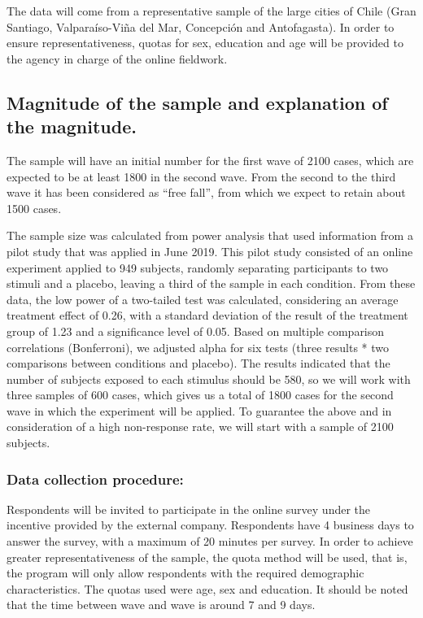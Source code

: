 \documentclass[
]{article}
\begin{document}
The data will come from a representative sample of the large cities of
Chile (Gran Santiago, Valparaíso-Viña del Mar, Concepción and
Antofagasta). In order to ensure representativeness, quotas for sex,
education and age will be provided to the agency in charge of the online
fieldwork.

\hypertarget{magnitude-of-the-sample-and-explanation-of-the-magnitude.}{%
\subsection{Magnitude of the sample and explanation of the
magnitude.}\label{magnitude-of-the-sample-and-explanation-of-the-magnitude.}}

The sample will have an initial number for the first wave of 2100 cases,
which are expected to be at least 1800 in the second wave. From the
second to the third wave it has been considered as ``free fall'', from
which we expect to retain about 1500 cases.

The sample size was calculated from power analysis that used information
from a pilot study that was applied in June 2019. This pilot study
consisted of an online experiment applied to 949 subjects, randomly
separating participants to two stimuli and a placebo, leaving a third of
the sample in each condition. From these data, the low power of a
two-tailed test was calculated, considering an average treatment effect
of 0.26, with a standard deviation of the result of the treatment group
of 1.23 and a significance level of 0.05. Based on multiple comparison
correlations (Bonferroni), we adjusted alpha for six tests (three
results * two comparisons between conditions and placebo). The results
indicated that the number of subjects exposed to each stimulus should be
580, so we will work with three samples of 600 cases, which gives us a
total of 1800 cases for the second wave in which the experiment will be
applied. To guarantee the above and in consideration of a high
non-response rate, we will start with a sample of 2100 subjects.

\hypertarget{data-collection-procedure}{%
\subsubsection{Data collection
procedure:}\label{data-collection-procedure}}

Respondents will be invited to participate in the online survey under
the incentive provided by the external company. Respondents have 4
business days to answer the survey, with a maximum of 20 minutes per
survey. In order to achieve greater representativeness of the sample,
the quota method will be used, that is, the program will only allow
respondents with the required demographic characteristics. The quotas
used were age, sex and education. It should be noted that the time
between wave and wave is around 7 and 9 days.
\end{document}
